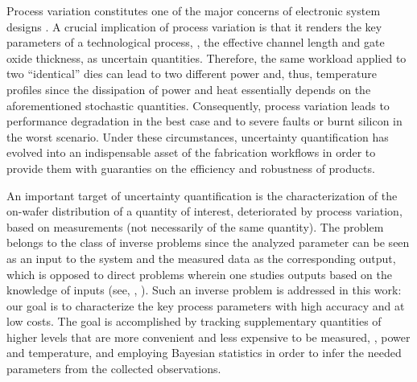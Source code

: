 Process variation constitutes one of the major concerns of electronic system designs \cite{chandrakasan2001, srivastava2010}. A crucial implication of process variation is that it renders the key parameters of a technological process, \eg, the effective channel length and gate oxide thickness, as uncertain quantities.
Therefore, the same workload applied to two ``identical'' dies can lead to two different power and, thus, temperature profiles since the dissipation of power and heat essentially depends on the aforementioned stochastic quantities.
Consequently, process variation leads to performance degradation in the best case and to severe faults or burnt silicon in the worst scenario.
Under these circumstances, uncertainty quantification has evolved into an indispensable asset of the fabrication workflows in order to provide them with guaranties on the efficiency and robustness of products.

An important target of uncertainty quantification is the characterization of the on-wafer distribution of a quantity of interest, deteriorated by process variation, based on measurements (not necessarily of the same quantity).
The problem belongs to the class of inverse problems since the analyzed parameter can be seen as an input to the system and the measured data as the corresponding output, which is opposed to direct problems wherein one studies outputs based on the knowledge of inputs (see, \eg, \cite{juan2012}).
Such an inverse problem is addressed in this work: our goal is to characterize the key process parameters with high accuracy and at low costs.
The goal is accomplished by tracking supplementary quantities of higher levels that are more convenient and less expensive to be measured, \eg, power and temperature, and employing Bayesian statistics \cite{gelman2004} in order to infer the needed parameters from the collected observations.

